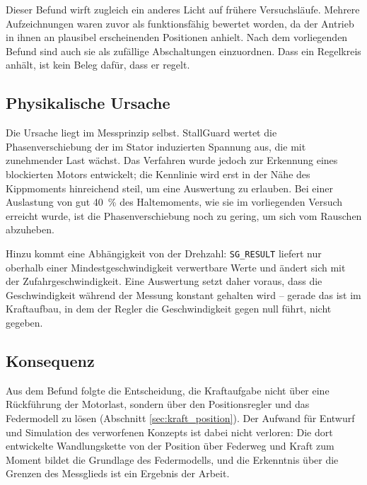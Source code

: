 Dieser Befund wirft zugleich ein anderes Licht auf frühere Versuchsläufe. Mehrere
Aufzeichnungen waren zuvor als funktionsfähig bewertet worden, da der Antrieb in ihnen an
plausibel erscheinenden Positionen anhielt. Nach dem vorliegenden Befund sind auch sie als
zufällige Abschaltungen einzuordnen. Dass ein Regelkreis anhält, ist kein Beleg dafür,
dass er regelt.

\subsection*{Physikalische Ursache}

Die Ursache liegt im Messprinzip selbst. StallGuard wertet die Phasenverschiebung der im
Stator induzierten Spannung aus, die mit zunehmender Last wächst. Das Verfahren wurde
jedoch zur Erkennung eines blockierten Motors entwickelt; die Kennlinie wird erst in der
Nähe des Kippmoments hinreichend steil, um eine Auswertung zu erlauben. Bei einer
Auslastung von gut 40~\% des Haltemoments, wie sie im vorliegenden Versuch erreicht wurde,
ist die Phasenverschiebung noch zu gering, um sich vom Rauschen abzuheben.

Hinzu kommt eine Abhängigkeit von der Drehzahl: \texttt{SG\_RESULT} liefert nur oberhalb
einer Mindestgeschwindigkeit verwertbare Werte und ändert sich mit der
Zufahrgeschwindigkeit. Eine Auswertung setzt daher voraus, dass die Geschwindigkeit
während der Messung konstant gehalten wird -- gerade das ist im Kraftaufbau, in dem der
Regler die Geschwindigkeit gegen null führt, nicht gegeben.

\subsection*{Konsequenz}

Aus dem Befund folgte die Entscheidung, die Kraftaufgabe nicht über eine Rückführung der
Motorlast, sondern über den Positionsregler und das Federmodell zu lösen (Abschnitt
\ref{sec:kraft_position}). Der Aufwand für Entwurf und Simulation des verworfenen
Konzepts ist dabei nicht verloren: Die dort entwickelte Wandlungskette von der Position
über Federweg und Kraft zum Moment bildet die Grundlage des Federmodells, und die
Erkenntnis über die Grenzen des Messglieds ist ein Ergebnis der Arbeit.